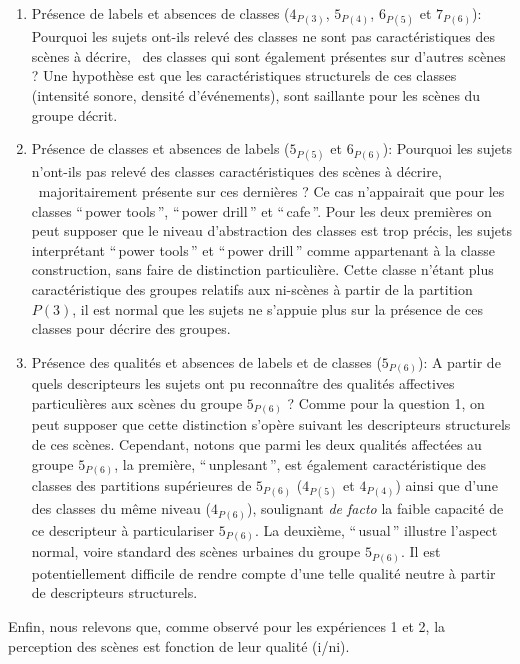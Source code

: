 \begin{enumerate}
\item Présence de labels et absences de classes ($4_{P(3)}$, $5_{P(4)}$, $6_{P(5)}$ et $7_{P(6)}$): Pourquoi les sujets ont-ils relevé des classes ne sont pas caractéristiques des scènes à décrire, \ie~des classes qui sont également présentes sur d'autres scènes ? Une hypothèse est que les caractéristiques structurels de ces classes (intensité sonore, densité d'événements), sont saillante pour les scènes du groupe décrit.
\item Présence de classes et absences de labels ($5_{P(5)}$ et $6_{P(6)}$): Pourquoi les sujets n'ont-ils pas relevé des classes caractéristiques des scènes à décrire, \ie~majoritairement présente sur ces dernières ? Ce cas n’appairait que pour les classes ``\,power tools\,'', ``\,power drill\,'' et  ``\,cafe\,''. Pour les deux premières on peut supposer que le niveau d'abstraction des classes est trop précis, les sujets interprétant ``\,power tools\,'' et ``\,power drill\,'' comme appartenant à la classe construction, sans faire de distinction particulière. Cette classe n'étant plus caractéristique des groupes relatifs aux ni-scènes à partir de la partition $P(3)$, il est normal que les sujets ne s'appuie plus sur la présence de ces classes pour décrire des groupes.
\item Présence des qualités et absences de labels et de classes ($5_{P(6)}$): A partir de quels descripteurs les sujets ont pu reconnaître des qualités affectives particulières aux scènes du groupe $5_{P(6)}$ ? Comme pour la question 1, on peut supposer que cette distinction s'opère suivant les descripteurs structurels de ces scènes. Cependant, notons que parmi les deux qualités affectées au groupe $5_{P(6)}$, la première, ``\,unplesant\,'', est également caractéristique des classes des partitions supérieures de $5_{P(6)}$ ($4_{P(5)}$ et $4_{P(4)}$) ainsi que d'une des classes du même niveau ($4_{P(6)}$), soulignant \emph{de facto} la faible capacité de ce descripteur à particulariser $5_{P(6)}$. La deuxième, ``\,usual\,'' illustre l'aspect normal, voire standard des scènes urbaines du groupe $5_{P(6)}$. Il est potentiellement difficile de rendre compte d'une telle qualité neutre à partir de descripteurs structurels.
\end{enumerate}


Enfin, nous relevons que, comme observé pour les expériences 1 et 2, la perception des scènes est fonction de leur qualité (i/ni).

